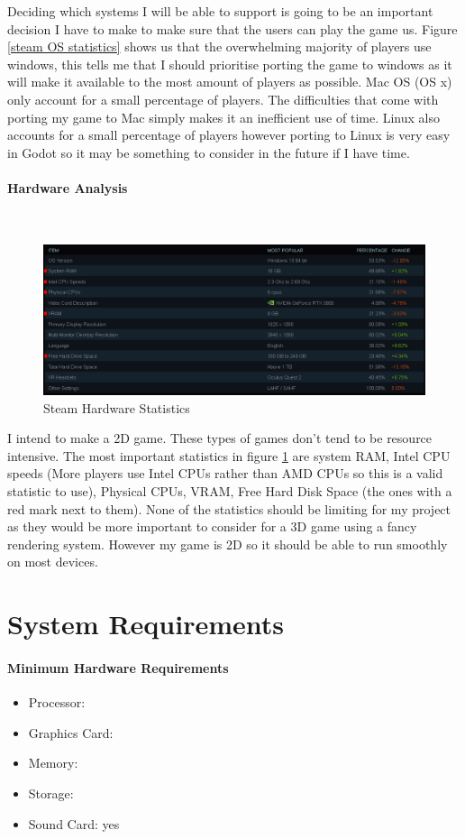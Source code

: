 \documentclass{article}
\newcommand{\parBr}{\vspace{5mm}}%
\newcommand{\myparagraph}[1]{\paragraph{#1}\mbox{}\\} %
\begin{document}
Deciding which systems I will be able to support is going to be an important decision I have to make to make sure that the users can play the game us. Figure \ref{steam OS statistics} shows us that the overwhelming majority of players use windows, this tells me that I should prioritise porting the game to windows as it will make it available to the most amount of players as possible. Mac OS (OS x) only account for a small percentage of players. The difficulties that come with porting my game to Mac simply makes it an inefficient use of time. Linux also accounts for a small percentage of players however porting to Linux is very easy in Godot so it may be something to consider in the future if I have time.

\parBr
\parBr

\myparagraph{Hardware Analysis}
\begin{figure}[ht]
\centering
\includegraphics[width = 0.4\textheight]{steamSurvey}
\caption{\cite{SHS} Steam Hardware Statistics}
\label{steam statistics}
\end{figure}

I intend to make a 2D game. These types of games don't tend to be resource intensive. The most important statistics in figure \ref{steam statistics} are system RAM, Intel CPU speeds (More players use Intel CPUs rather than AMD CPUs so this is a valid statistic to use), Physical CPUs, VRAM, Free Hard Disk Space (the ones with a red mark next to them). None of the statistics should be limiting for my project as they would be more important to consider for a 3D game using a fancy rendering system. However my game is 2D so it should be able to run smoothly on most devices.

\section{System Requirements}
\paragraph{Minimum Hardware Requirements}
\begin{itemize}
\item Processor:   
\item Graphics Card:   
\item Memory:   
\item Storage:   
\item Sound Card: yes
\end{itemize}
\end{document}
